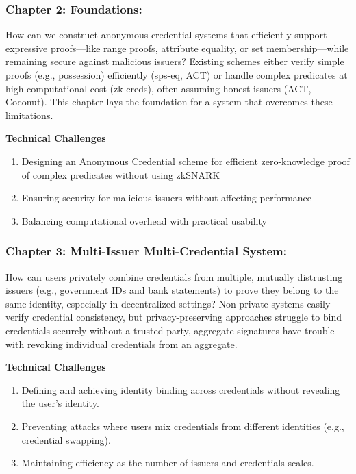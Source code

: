 \subsubsection*{Chapter 2: Foundations: } 
How can we construct anonymous credential systems that efficiently support expressive proofs—like range proofs, attribute equality, or set membership—while remaining secure against malicious issuers? Existing schemes either verify simple proofs (e.g., possession) efficiently (sps-eq, ACT) or handle complex predicates at high computational cost (zk-creds), often assuming honest issuers (ACT, Coconut). This chapter lays the foundation for a system that overcomes these limitations.

\noindent \textbf{Technical Challenges}
\begin{enumerate}
    \item Designing an Anonymous Credential scheme for efficient zero-knowledge proof of complex predicates without using zkSNARK
    \item Ensuring security for malicious issuers without affecting performance
    \item Balancing computational overhead with practical usability
\end{enumerate}

\subsubsection*{Chapter 3: Multi-Issuer Multi-Credential System: } 
How can users privately combine credentials from multiple, mutually distrusting issuers (e.g., government IDs and bank statements) to prove they belong to the same identity, especially in decentralized settings? Non-private systems easily verify credential consistency, but privacy-preserving approaches struggle to bind credentials securely without a trusted party, aggregate signatures \cite{mir_aggregate_2023} have trouble with revoking individual credentials from an aggregate.

\noindent \textbf{Technical Challenges}
\begin{enumerate}
    \item Defining and achieving identity binding across credentials without revealing the user’s identity.
    \item Preventing attacks where users mix credentials from different identities (e.g., credential swapping).
    \item Maintaining efficiency as the number of issuers and credentials scales.
\end{enumerate}



